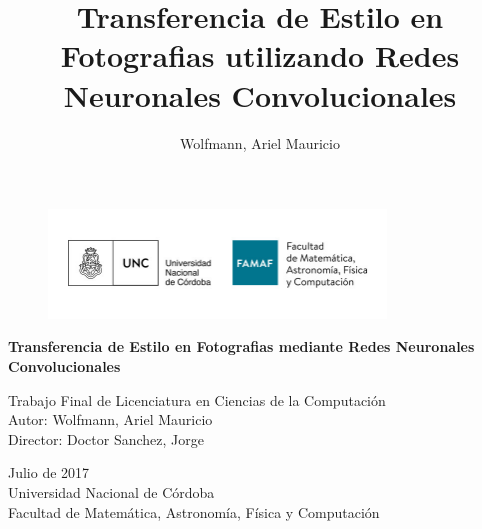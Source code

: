 \documentclass[a4paper,11pt,spanish]{book}
\title{Transferencia de Estilo en Fotografias utilizando Redes Neuronales Convolucionales}   %
\author{Wolfmann, Ariel Mauricio}             %
\begin{document}



\begin{titlepage}
    \begin{figure}[H]
      \begin{center}
      \includegraphics[width=0.8\textwidth]{./img/logo_unc.jpg}
    \end{center}
  \end{figure}
  \begin{center}
  \vspace*{0.5in}
    \begin{Huge}
    \textbf{Transferencia de Estilo en Fotografias mediante Redes Neuronales Convolucionales} \\
    \end{Huge}
    \begin{large}
      \vspace*{0.25in}
       Trabajo Final de Licenciatura en Ciencias de la Computación\\
       \vspace*{0.15in}
       Autor: Wolfmann, Ariel Mauricio\\
       Director: Doctor Sanchez, Jorge\\
    \end{large}
  \end{center}
  \begin{center}
    \vspace*{0.15in}
     Julio de 2017\\
    \vspace*{0.15in}
    Universidad Nacional de Córdoba\\
    \vspace*{0.15in}
    Facultad de Matemática, Astronomía, Física y Computación\\
  \end{center}
  
\end{titlepage}
\end{document}
